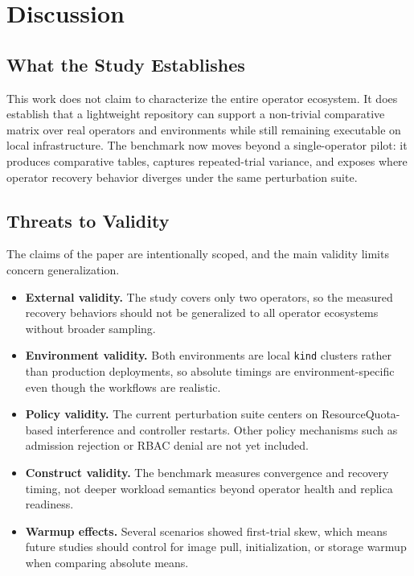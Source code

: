 \documentclass[sigconf,screen]{acmart}
\begin{document}
\section{Discussion}

\subsection{What the Study Establishes}

This work does not claim to characterize the entire operator ecosystem. It does
establish that a lightweight repository can support a non-trivial comparative
matrix over real operators and environments while still remaining executable on
local infrastructure. The benchmark now moves beyond a single-operator pilot:
it produces comparative tables, captures repeated-trial variance, and exposes
where operator recovery behavior diverges under the same perturbation suite.

\subsection{Threats to Validity}

The claims of the paper are intentionally scoped, and the main validity limits
concern generalization.

\begin{itemize}
  \item \textbf{External validity.} The study covers only two operators, so the
  measured recovery behaviors should not be generalized to all operator
  ecosystems without broader sampling.
  \item \textbf{Environment validity.} Both environments are local
  \texttt{kind} clusters rather than production deployments, so absolute
  timings are environment-specific even though the workflows are realistic.
  \item \textbf{Policy validity.} The current perturbation suite centers on
  ResourceQuota-based interference and controller restarts. Other policy
  mechanisms such as admission rejection or RBAC denial are not yet included.
  \item \textbf{Construct validity.} The benchmark measures convergence and
  recovery timing, not deeper workload semantics beyond operator health and
  replica readiness.
  \item \textbf{Warmup effects.} Several scenarios showed first-trial skew,
  which means future studies should control for image pull, initialization, or
  storage warmup when comparing absolute means.
\end{itemize}
\end{document}
